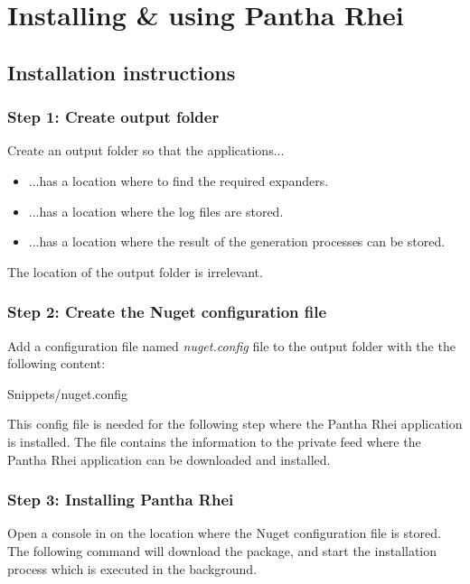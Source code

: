 \chapter{Installing \& using Pantha Rhei} \label{appendix_installation_instructions} 

\section{Installation instructions} \label{appendix_installation_prerequisits}
\subsection*{Step 1: Create output folder}
Create an output folder so that the applications...
\begin{itemize}
    \item ...has a location where to find the required expanders.
    \item ...has a location where the log files are stored.
    \item ...has a location where the result of the generation processes can be stored.
\end{itemize}

The location of the output folder is irrelevant.

\subsection*{Step 2: Create the Nuget configuration file}
Add a configuration file named \emph{nuget.config} file to the output folder with the
the following content: 

 {Snippets/nuget.config}

This config file is needed for the following step where the Pantha Rhei application is
installed. The file contains the information to the private feed where the Pantha Rhei
application can be downloaded and installed.

\subsection{Step 3: Installing Pantha Rhei} \label{appendix_installing_pantha_rhei} 
Open a console in on the location where the Nuget configuration file is stored. The
following command will download the package, and start the installation process which is
executed in the background. 

